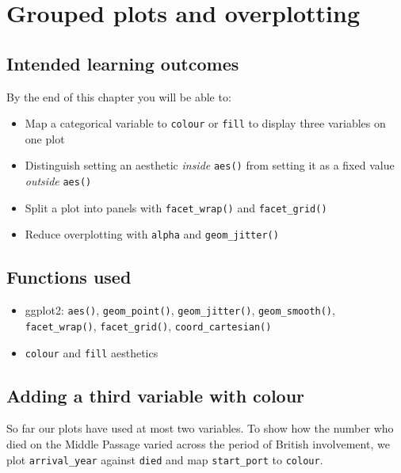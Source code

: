 \documentclass[
  english,
  letterpaper,
]{book}
\providecommand{\tightlist}{%
  \setlength{\itemsep}{0pt}\setlength{\parskip}{0pt}}
\begin{document}

\chapter{Grouped plots and overplotting}\label{sec-grouped-plots}

\section{Intended learning outcomes}\label{intended-learning-outcomes-4}

By the end of this chapter you will be able to:

\begin{itemize}
\tightlist
\item
  Map a categorical variable to \texttt{colour} or \texttt{fill} to
  display three variables on one plot
\item
  Distinguish setting an aesthetic \emph{inside} \texttt{aes()} from
  setting it as a fixed value \emph{outside} \texttt{aes()}
\item
  Split a plot into panels with \texttt{facet\_wrap()} and
  \texttt{facet\_grid()}
\item
  Reduce overplotting with \texttt{alpha} and \texttt{geom\_jitter()}
\end{itemize}

\section{Functions used}\label{functions-used-3}

\begin{itemize}
\tightlist
\item
  ggplot2: \texttt{aes()}, \texttt{geom\_point()},
  \texttt{geom\_jitter()}, \texttt{geom\_smooth()},
  \texttt{facet\_wrap()}, \texttt{facet\_grid()},
  \texttt{coord\_cartesian()}
\item
  \texttt{colour} and \texttt{fill} aesthetics
\end{itemize}

\section{Adding a third variable with
colour}\label{adding-a-third-variable-with-colour}

So far our plots have used at most two variables. To show how the number
who died on the Middle Passage varied across the period of British
involvement, we plot \texttt{arrival\_year} against \texttt{died} and
map \texttt{start\_port} to \texttt{colour}.
\end{document}

